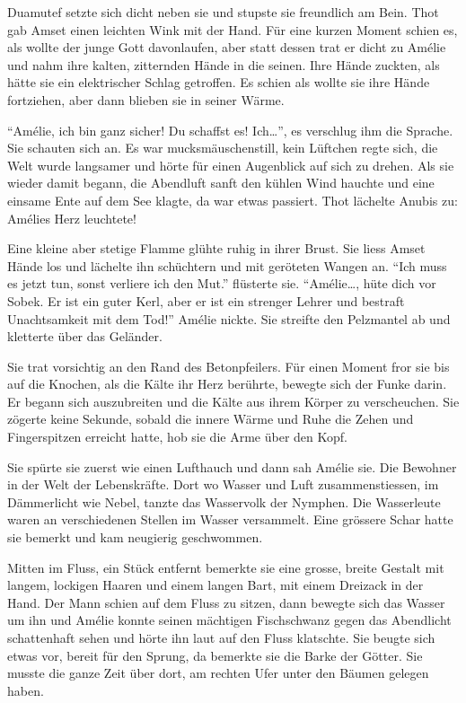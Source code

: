 \documentclass[11pt,titlepage,a5paper]{book}
\begin{document}
Duamutef setzte sich dicht neben sie und stupste sie freundlich am Bein. Thot gab Amset einen leichten Wink mit der Hand. Für eine kurzen Moment schien es, als wollte der junge Gott davonlaufen, aber statt dessen trat er dicht zu Amélie und nahm ihre kalten, zitternden Hände in die seinen. Ihre Hände zuckten, als hätte sie ein elektrischer Schlag getroffen. Es schien als wollte sie ihre Hände fortziehen, aber dann blieben sie in seiner Wärme.

"`Amélie, ich bin ganz sicher! Du schaffst es! Ich\dots"', es verschlug ihm die Sprache. Sie schauten sich an. Es war mucksmäuschenstill, kein Lüftchen regte sich, die Welt wurde langsamer und hörte für einen Augenblick auf sich zu drehen. Als sie wieder damit begann, die Abendluft sanft den kühlen Wind hauchte und eine einsame Ente auf dem See klagte, da war etwas passiert. Thot lächelte Anubis zu: Amélies Herz leuchtete!

Eine kleine aber stetige Flamme glühte ruhig in ihrer Brust. Sie liess Amset Hände los und lächelte ihn schüchtern und mit geröteten Wangen an. "`Ich muss es jetzt tun, sonst verliere ich den Mut."' flüsterte sie. "`Amélie\dots, hüte dich vor Sobek. Er ist ein guter Kerl, aber er ist ein strenger Lehrer und bestraft Unachtsamkeit mit dem Tod!"' Amélie nickte. Sie streifte den Pelzmantel ab und kletterte über das Geländer. 

Sie trat vorsichtig an den Rand des Betonpfeilers. Für einen Moment fror sie bis auf die Knochen, als die Kälte ihr Herz berührte, bewegte sich der Funke darin. Er begann sich auszubreiten und die Kälte aus ihrem Körper zu verscheuchen. Sie zögerte keine Sekunde, sobald die innere Wärme und Ruhe die Zehen und Fingerspitzen erreicht hatte, hob sie die Arme über den Kopf. 

Sie spürte sie zuerst wie einen Lufthauch und dann sah Amélie sie. Die Bewohner in der Welt der Lebenskräfte. Dort wo Wasser und Luft zusammenstiessen, im Dämmerlicht wie Nebel, tanzte das Wasservolk der Nymphen. Die Wasserleute waren an verschiedenen Stellen im Wasser versammelt. Eine grössere Schar hatte sie bemerkt und kam neugierig geschwommen.

Mitten im Fluss, ein Stück entfernt bemerkte sie eine grosse, breite Gestalt mit langem, lockigen Haaren und einem langen Bart, mit einem Dreizack in der Hand. Der Mann schien auf dem Fluss zu sitzen, dann bewegte sich das Wasser um ihn und Amélie konnte seinen mächtigen Fischschwanz gegen das Abendlicht schattenhaft sehen und hörte ihn laut auf den Fluss klatschte. Sie beugte sich etwas vor, bereit für den Sprung, da bemerkte sie die Barke der Götter. Sie musste die ganze Zeit über dort, am rechten Ufer unter den Bäumen gelegen haben. 
\end{document}
